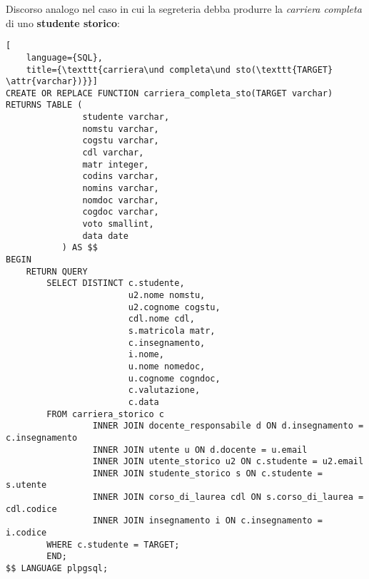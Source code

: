 \documentclass{article}
\newcommand{\attr}[1]{\texttt{\textcolor{gray}{#1}}}
\newcommand{\und}[0]{\textunderscore}
\begin{document}
Discorso analogo nel caso in cui la segreteria debba produrre la \textit{carriera completa} di uno \textbf{studente storico}:

\begin{lstlisting}[
    language={SQL},
    title={\texttt{carriera\und completa\und sto(\texttt{TARGET} \attr{varchar})}}]
CREATE OR REPLACE FUNCTION carriera_completa_sto(TARGET varchar) RETURNS TABLE (
               studente varchar,
               nomstu varchar,
               cogstu varchar,
               cdl varchar,
               matr integer,
               codins varchar,
               nomins varchar,
               nomdoc varchar,
               cogdoc varchar,
               voto smallint,
               data date
           ) AS $$
BEGIN
    RETURN QUERY
        SELECT DISTINCT c.studente,
                        u2.nome nomstu,
                        u2.cognome cogstu,
                        cdl.nome cdl,
                        s.matricola matr,
                        c.insegnamento,
                        i.nome,
                        u.nome nomedoc,
                        u.cognome cogndoc,
                        c.valutazione,
                        c.data
        FROM carriera_storico c
                 INNER JOIN docente_responsabile d ON d.insegnamento = c.insegnamento
                 INNER JOIN utente u ON d.docente = u.email
                 INNER JOIN utente_storico u2 ON c.studente = u2.email
                 INNER JOIN studente_storico s ON c.studente = s.utente
                 INNER JOIN corso_di_laurea cdl ON s.corso_di_laurea = cdl.codice
                 INNER JOIN insegnamento i ON c.insegnamento = i.codice
        WHERE c.studente = TARGET;
        END;
$$ LANGUAGE plpgsql;
\end{lstlisting}
\end{document}
